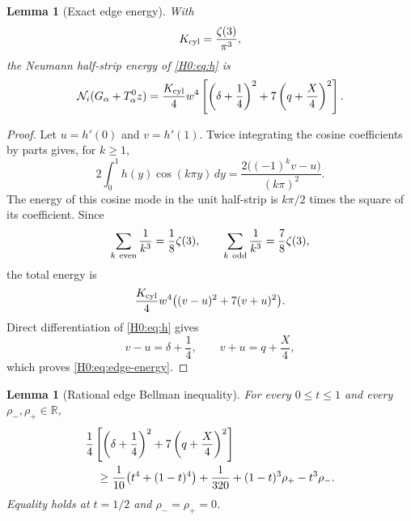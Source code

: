 \documentclass[11pt]{amsart}
\numberwithin{equation}{section}
\newtheorem{lemma}[theorem]{Lemma}
\theoremstyle{definition}
\theoremstyle{remark}
\newcommand{\R}{\mathbb R}
\begin{document}
\begin{lemma}[Exact edge energy]\label{H0:lem:edge-energy}
With
\begin{equation}
 K_{\rm cyl}=\frac{\zeta(3)}{\pi^3},
\end{equation}
the Neumann half-strip energy of \eqref{H0:eq:h} is
\begin{equation}\label{H0:eq:edge-energy}
 \mathcal N_i(G_\alpha+T_\alpha^0z)
 =\frac{K_{\rm cyl}}4w^4
 \left[\left(\delta+\frac14\right)^2
 +7\left(q+\frac X4\right)^2\right].
\end{equation}
\end{lemma}

\begin{proof}
Let $u=h'(0)$ and $v=h'(1)$.  Twice integrating the cosine coefficients by
parts gives, for $k\ge1$,
\begin{equation}
 2\int_0^1h(y)\cos(k\pi y)\,dy
 =\frac{2\bigl((-1)^kv-u\bigr)}{(k\pi)^2}.
\end{equation}
The energy of this cosine mode in the unit half-strip is $k\pi/2$ times
the square of its coefficient.  Since
\begin{equation}
 \sum_{k\ {\rm even}}\frac1{k^3}=\frac18\zeta(3),
\qquad
 \sum_{k\ {\rm odd}}\frac1{k^3}=\frac78\zeta(3),
\end{equation}
the total energy is
\begin{equation}
 \frac{K_{\rm cyl}}4w^4
 \bigl((v-u)^2+7(v+u)^2\bigr).
\end{equation}
Direct differentiation of \eqref{H0:eq:h} gives
\begin{equation}
 v-u=\delta+\frac14,
 \qquad v+u=q+\frac X4,
\end{equation}
which proves \eqref{H0:eq:edge-energy}.
\end{proof}

\begin{lemma}[Rational edge Bellman inequality]\label{H0:lem:bellman}
For every $0\le t\le1$ and every $\rho_-,\rho_+\in\R$,
\begin{align}
 &\frac14\left[\left(\delta+\frac14\right)^2
 +7\left(q+\frac X4\right)^2\right]\notag\\
 &\quad\ge
 \frac1{10}\bigl(t^4+(1-t)^4\bigr)+\frac1{320}
 +(1-t)^3\rho_+-t^3\rho_- .
 \label{H0:eq:bellman}
\end{align}
Equality holds at $t=1/2$ and $\rho_-=\rho_+=0$.
\end{lemma}
\end{document}
